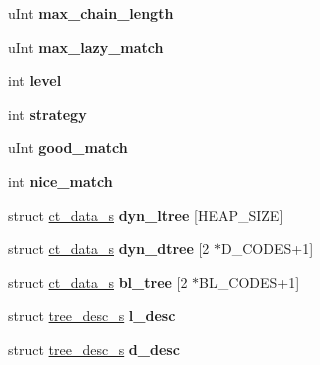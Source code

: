 \begin{DoxyCompactItemize}
u\+Int {\bfseries max\+\_\+chain\+\_\+length}
\item 
\mbox{\label{structinternal__state_ab74215ec1c106bf588a7642927d47b84}} 
u\+Int {\bfseries max\+\_\+lazy\+\_\+match}
\item 
\mbox{\label{structinternal__state_a7ad2ab1df80c8cab4ffb97ff84e88c62}} 
int {\bfseries level}
\item 
\mbox{\label{structinternal__state_a67219312df7fd2f86e06e6f14700eb28}} 
int {\bfseries strategy}
\item 
\mbox{\label{structinternal__state_a68ba00254242017f330dca5e0191bca4}} 
u\+Int {\bfseries good\+\_\+match}
\item 
\mbox{\label{structinternal__state_a39ab99e52138c0628f645bc1e0c69a04}} 
int {\bfseries nice\+\_\+match}
\item 
\mbox{\label{structinternal__state_ae11867c05d54c575dbc713bbea71266c}} 
struct \mbox{\hyperlink{structct__data__s}{ct\+\_\+data\+\_\+s}} {\bfseries dyn\+\_\+ltree} \mbox{[}H\+E\+A\+P\+\_\+\+S\+I\+ZE\mbox{]}
\item 
\mbox{\label{structinternal__state_a42a52476d3cde41e57a6ef2a6a78008f}} 
struct \mbox{\hyperlink{structct__data__s}{ct\+\_\+data\+\_\+s}} {\bfseries dyn\+\_\+dtree} \mbox{[}2 $\ast$D\+\_\+\+C\+O\+D\+ES+1\mbox{]}
\item 
\mbox{\label{structinternal__state_a98131fc5b64d0d7542bc3621aef19854}} 
struct \mbox{\hyperlink{structct__data__s}{ct\+\_\+data\+\_\+s}} {\bfseries bl\+\_\+tree} \mbox{[}2 $\ast$B\+L\+\_\+\+C\+O\+D\+ES+1\mbox{]}
\item 
\mbox{\label{structinternal__state_a0266c4e0250652904e6b4908d8da84a9}} 
struct \mbox{\hyperlink{structtree__desc__s}{tree\+\_\+desc\+\_\+s}} {\bfseries l\+\_\+desc}
\item 
\mbox{\label{structinternal__state_ab2fddb383d3055b6ec81c7fef14e99d8}} 
struct \mbox{\hyperlink{structtree__desc__s}{tree\+\_\+desc\+\_\+s}} {\bfseries d\+\_\+desc}

\end{DoxyCompactItemize}
